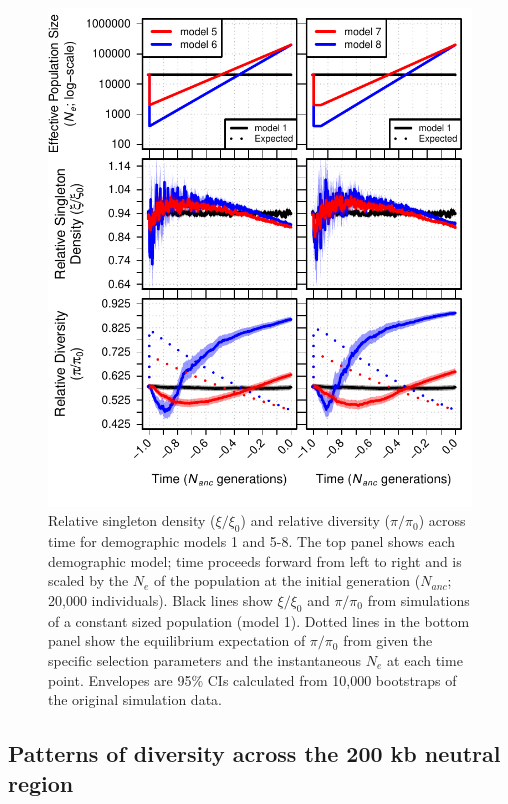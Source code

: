 \documentclass[9pt,twocolumn,twoside]{rilabRxiv}
\begin{document}
\begin{figure}[t!]
\includegraphics[width=\linewidth]{figures/fig3newclean.pdf}
\caption{Relative singleton density ($\xi/\xi_0$) and relative diversity ($\pi/\pi_0$) across time for demographic models 1 and 5-8.
The top panel shows each demographic model; time proceeds forward from left to right and is scaled by the $N_e$ of the population at the initial generation ($N_{anc}$; 20,000 individuals).
Black lines show $\xi/\xi_0$ and $\pi/\pi_0$ from simulations of a constant sized population (model 1).
Dotted lines in the bottom panel show the equilibrium expectation of $\pi/\pi_0$ from  \citet{nordborg1996effect} given the specific selection parameters and the instantaneous $N_e$ at each time point.
Envelopes are 95\% CIs calculated from 10,000 bootstraps of the original simulation data.}
\label{fig:3new}
\end{figure}

\subsection{Patterns of diversity across the 200 kb neutral region}
\end{document}
